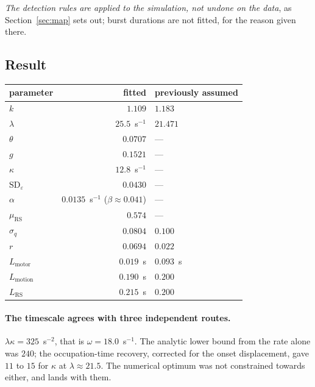 \documentclass[a4paper,11pt]{article}
\newcommand{\1}{\mathbbm{1}}
\newcommand{\Lmot}{L_{\mathrm{motion}}}
\newcommand{\Lrs}{L_{\mathrm{RS}}}
\newcommand{\Lmo}{L_{\mathrm{motor}}}
\begin{document}
\emph{The detection rules are applied to the simulation, not undone on the data}, as
Section~\ref{sec:map} sets out; burst durations are not fitted, for the reason given
there.

\subsection{Result}
\label{sec:calres}

\begin{center}
\begin{tabular}{lrl}
\toprule
parameter & fitted & previously assumed\\
\midrule
$k$ & $1.109$ & $1.183$\\
$\lambda$ & $25.5$~s$^{-1}$ & $21.471$\\
$\theta$ & $0.0707$ & ---\\
$g$ & $0.1521$ & ---\\
$\kappa$ & $12.8$~s$^{-1}$ & ---\\
$\mathrm{SD}_\varepsilon$ & $0.0430$ & ---\\
$\alpha$ & $0.0135$~s$^{-1}$ ($\beta\approx0.041$) & ---\\
$\mu_{\mathrm{RS}}$ & $0.574$ & ---\\
$\sigma_q$ & $0.0804$ & $0.100$\\
$r$ & $\mathbf{0.0694}$ & $\mathbf{0.022}$\\
$\Lmo$ & $\mathbf{0.019}$~s & $\mathbf{0.093}$~s\\
$\Lmot$ & $0.190$~s & $0.200$\\
$\Lrs$ & $0.215$~s & $0.200$\\
\bottomrule
\end{tabular}
\end{center}

\paragraph{The timescale agrees with three independent routes.}
$\lambda\kappa=325$~s$^{-2}$, that is $\omega=18.0$~s$^{-1}$. The analytic
lower bound from the rate alone was $240$; the occupation-time recovery, corrected for
the onset displacement, gave $11$ to $15$ for $\kappa$ at
$\lambda\approx21.5$. The numerical optimum was not constrained towards either, and
lands with them.
\end{document}
